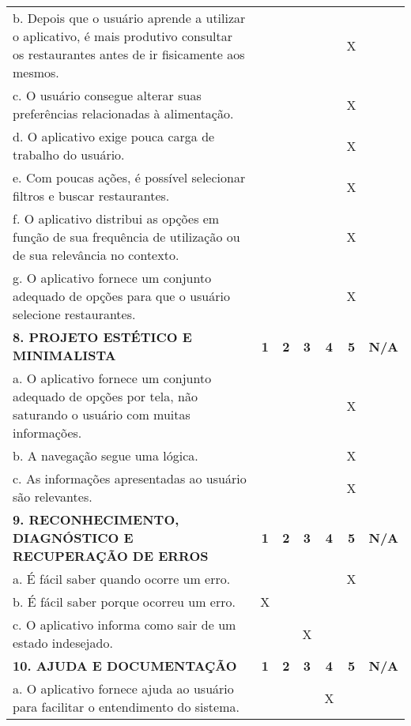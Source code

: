 \documentclass[portuguese,oneside]{tcc}
\begin{document}
\begin{center}
\begin{longtabu}{|L{25em}|c|c|c|c|c|c|}
													b. Depois que o usuário aprende a utilizar o aplicativo, é mais produtivo consultar os restaurantes antes de ir fisicamente aos mesmos. & & & & & X & \\ 
													c. O usuário consegue alterar suas preferências relacionadas à alimentação. & & & & & X & \\ 
													d. O aplicativo exige pouca carga de trabalho do usuário. & & & & & X & \\ 
													e. Com poucas ações, é possível selecionar filtros e buscar restaurantes. & & & & & X & \\ 
													f. O aplicativo distribui as opções em função de sua frequência de utilização ou de sua relevância no contexto.	& & & & & X & \\ 
													g. O aplicativo fornece um conjunto adequado de opções para que o usuário selecione restaurantes. & & & & & X & \\ 
													\textbf{8. PROJETO ESTÉTICO E MINIMALISTA} & \textbf{1} & \textbf{2} & \textbf{3} & \textbf{4} & \textbf{5} & \textbf{N/A} \\ 
													a. O aplicativo fornece um conjunto adequado de opções por tela, não saturando o usuário com muitas informações. & & & & & X & \\ 
													b. A navegação segue uma lógica. & & & & & X & \\ 
													c. As informações apresentadas ao usuário são relevantes. & & & & & X & \\ 
													\textbf{9. RECONHECIMENTO, DIAGNÓSTICO E RECUPERAÇÃO DE ERROS} & \textbf{1} & \textbf{2} & \textbf{3} & \textbf{4} & \textbf{5} & \textbf{N/A} \\ 
													a. É fácil saber quando ocorre um erro.	& & & & & X & \\ 
													b. É fácil saber porque ocorreu um erro. & X & & & & & \\ 
													c. O aplicativo informa como sair de um estado indesejado. & & & X & & & \\ 
													\textbf{10. AJUDA E DOCUMENTAÇÃO} & \textbf{1} & \textbf{2} & \textbf{3} & \textbf{4} & \textbf{5} & \textbf{N/A} \\ 
													a. O aplicativo fornece ajuda ao usuário para facilitar o entendimento do sistema. & & & & X & & \\ 

\end{longtabu}
\end{center}
\end{document}
